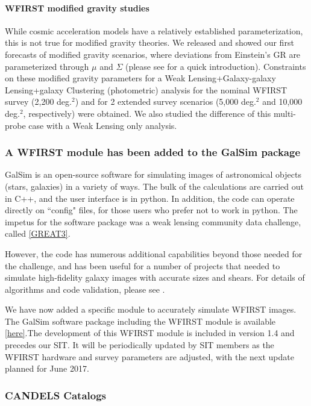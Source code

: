 \paragraph{WFIRST modified gravity studies} While cosmic acceleration models have a relatively established parameterization, this is not true for modified gravity theories. We released and showed our first forecasts of modified gravity scenarios, where deviations from Einstein's GR are parameterized through $\mu$ and $\Sigma$ (please see \citet{Joyce:2016vqv} for a quick introduction). Constraints on these modified gravity parameters for a Weak Lensing+Galaxy-galaxy Lensing+galaxy Clustering (photometric) analysis for the nominal WFIRST survey (2,200 deg.$^2$) and for 2 extended survey scenarios (5,000 deg.$^2$ and 10,000 deg.$^2$, respectively) were obtained. We also studied the difference of this multi-probe case with a Weak Lensing only analysis.

\subsubsection{A WFIRST module has been added to the GalSim package}

GalSim is an open-source software for simulating images of astronomical objects (stars, galaxies) in a variety of ways. The bulk of the calculations are carried out in C++, and the user interface is in python. In addition, the code can operate directly on ``config" files, for those users who prefer not to work in python. The impetus for the software package was a weak lensing community data challenge, called \href{http://great3challenge.info/}{[GREAT3]}.

However, the code has numerous additional capabilities beyond those needed for the challenge, and has been useful for a number of projects that needed to simulate high-fidelity galaxy images with accurate sizes and shears. For details of algorithms and code validation, please see \citet{Rowe:2015}.

We have now added a specific module to accurately simulate WFIRST images. The GalSim software package including the WFIRST module is available \href{https://github.com/GalSim-developers/GalSim}{[here]}.The development of this WFIRST module is included in version 1.4 and precedes our SIT. It will be periodically updated by SIT members as the WFIRST hardware and survey parameters are adjusted, with the next update planned for June 2017.

\subsubsection{CANDELS Catalogs}

